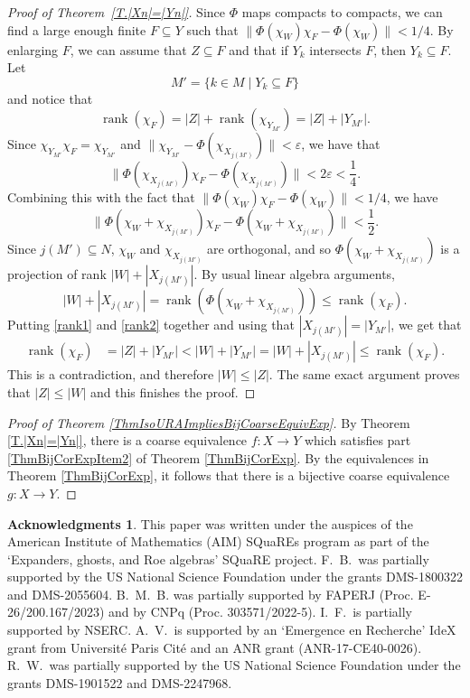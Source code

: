 \documentclass[11pt]{amsart}
\newcommand{\eps}{\varepsilon}
\numberwithin{equation}{section}
\theoremstyle{definition}
\newtheorem*{acknowledgments}{Acknowledgments}
\theoremstyle{remark}
\DeclareMathOperator{\rank}{rank}
\numberwithin{equation}{section}
\begin{document}
\begin{proof}[Proof of Theorem~\ref{T.|Xn|=|Yn|}]
Since $\Phi$ maps compacts to compacts, we can find a large enough finite $F\subseteq Y$ such that $\|\Phi(\chi_W)\chi_F-\Phi(\chi_W)\|<1/4$. By enlarging $F$, we can assume that $Z\subseteq F$ and that if $Y_k$ intersects $F$, then $Y_k\subseteq F$. Let \[M'=\{k\in M\mid Y_k\subseteq F\}\] and notice that
\begin{equation}\label{rank1}
\rank(\chi_F)=|Z|+\rank(\chi_{Y_{M'}})=|Z|+|Y_{M'}|.
\end{equation}
Since $\chi_{Y_{M'}}\chi_F=\chi_{Y_{M'}}$ and $\|\chi_{Y_{M'}}-\Phi(\chi_{X_{j(M')}})\|<\eps$, we have that 
\[
\|\Phi(\chi_{X_{j(M')}})\chi_F-\Phi(\chi_{X_{j(M')}})\|<2\eps<\frac{1}{4}.
\]
Combining this with the fact that $\|\Phi(\chi_W)\chi_F-\Phi(\chi_W)\|<1/4$, we have   
\[
\|\Phi(\chi_W+\chi_{X_{j(M')}})\chi_F-\Phi(\chi_W+\chi_{X_{j(M')}})\|<\frac{1}{2}.
\]
 Since $j(M')\subseteq N$,   $\chi_W$ and $\chi_{X_{j(M')}}$ are orthogonal, and so $\Phi(\chi_W+\chi_{X_{j(M')}})$ is a projection of rank $|W|+|X_{j(M')}|$. By usual linear algebra arguments, 
\begin{equation}\label{rank2}
|W|+|X_{j(M')}|=\rank (\Phi(\chi_W+\chi_{X_{j(M')}}))\leq\rank(\chi_F).
\end{equation}
 Putting \eqref{rank1} and \eqref{rank2} together and using that $|X_{j(M')}|=|Y_{M'}|$, we get that 
\begin{align*}
\rank(\chi_F)&=|Z|+|Y_{M'}|<|W|+|Y_{M'}|=|W|+|X_{j(M')}|\leq\rank(\chi_F).
\end{align*}
This is a contradiction, and therefore $|W|\leq |Z|$. The same exact argument proves that $|Z|\leq |W|$ and this finishes the proof.
	\end{proof}

 


\begin{proof}[Proof of Theorem \ref{ThmIsoURAImpliesBijCoarseEquivExp}]
 By Theorem \ref{T.|Xn|=|Yn|}, there is a coarse equivalence $f\colon X\to Y$ which satisfies part \eqref{ThmBijCorExpItem2} of Theorem \ref{ThmBijCorExp}. By the equivalences in Theorem \ref{ThmBijCorExp}, it follows that there is a bijective coarse equivalence $g\colon X\to Y$.
\end{proof}
 
 \begin{acknowledgments}
This paper was written under the auspices of the American Institute of Mathematics (AIM) SQuaREs program as part of the `Expanders, ghosts, and Roe algebras' SQuaRE project. F.\ B.\ was partially supported by the US National Science Foundation under the grants DMS-1800322 and DMS-2055604. B.\ M.\ B.  was partially supported by FAPERJ (Proc. E-26/200.167/2023) and by CNPq (Proc. 303571/2022-5). I.\ F.\ is partially supported by NSERC. A.\ V.\ is supported by an `Emergence en Recherche' IdeX grant from Universit\'e Paris Cit\'e and an ANR grant (ANR-17-CE40-0026). R.\ W.\ was partially supported by the US National Science Foundation under the grants DMS-1901522 and DMS-2247968.
\end{acknowledgments}
\end{document}

